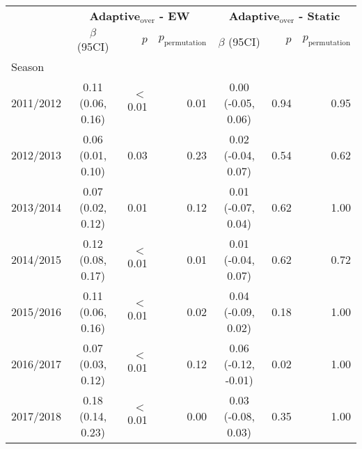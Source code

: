 \documentclass[sagev,times,Review,10pt]{sagej}
\def\adaptNon{\textbf{adaptive$_{\text{non}}$ }}
\begin{document}
\begin{appendix}
\begin{table}[ht!]
\caption{
Random effects regressions compared log scores between the \adaptNon vs equally-weighted and \adaptNon vs static ensembles.
The model included an intercept, and separate random effect for: season, region, and target.
The dependent variables is the difference in log scores paired by season-region-target-epidemic week.
Conditional mean, 95\%CI, asymptotic, and a permutation based p-value are reported.}

\end{table}

\clearpage
 
\begin{table}[ht!]
  \small
  \begin{tabular}{lcrrcrr}
    \hline
     & \multicolumn{3}{c}{\textbf{Adaptive$_{\text{over}}$ - EW}} & \multicolumn{3}{c}{\textbf{Adaptive$_{\text{over}}$ - Static}}\\
     & $\beta$ (95CI) & $p$ & $p_{\text{permutation}}$ & $\beta$ (95CI) & $p$ & $p_{\text{permutation}}$\\
     \hline
    
  Season\\
 \hspace{3mm} 2011/2012         & 0.11 (0.06, 0.16)  & $<$0.01 & 0.01   & 0.00 (-0.05,  0.06) & 0.94 & 0.95 \\
 \hspace{3mm} 2012/2013	        & 0.06 (0.01, 0.10)  &    0.03 & 0.23   & 0.02 (-0.04,  0.07) & 0.54 & 0.62 \\
 \hspace{3mm} 2013/2014	        & 0.07 (0.02, 0.12)  &    0.01 & 0.12   & 0.01 (-0.07,  0.04) & 0.62 & 1.00 \\
 \hspace{3mm} 2014/2015	        & 0.12 (0.08, 0.17)  & $<$0.01 & 0.01   & 0.01 (-0.04,  0.07) & 0.62 & 0.72 \\
 \hspace{3mm} 2015/2016	        & 0.11 (0.06, 0.16)  & $<$0.01 & 0.02   & 0.04 (-0.09,  0.02) & 0.18 & 1.00 \\
 \hspace{3mm} 2016/2017	        & 0.07 (0.03, 0.12)  & $<$0.01 & 0.12   & 0.06 (-0.12, -0.01) & 0.02 & 1.00 \\
 \hspace{3mm} 2017/2018	        & 0.18 (0.14, 0.23)  & $<$0.01 & 0.00   & 0.03 (-0.08,  0.03) & 0.35 & 1.00 \\ 


\end{tabular}
\end{table}
\end{appendix}
\end{document}

